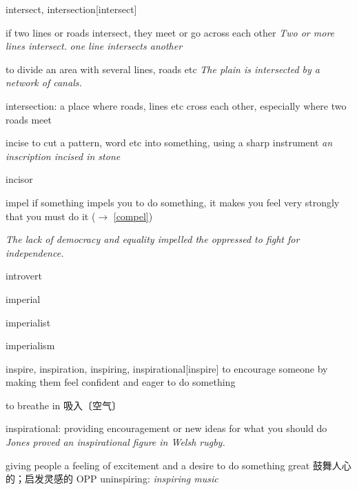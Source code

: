 \begin{DefWord}{intersect, intersection}[intersect]
    
    if two lines or roads intersect, they meet or go across each other
    \textit{Two or more lines intersect.}
    \textit{one line intersects another}

    to divide an area with several lines, roads etc
    \textit{The plain is intersected by a network of canals.}

    intersection: a place where roads, lines etc cross each other, especially where two roads meet
\end{DefWord}


\begin{DefWord}{incise}
    to cut a pattern, word etc into something, using a sharp instrument
    \textit{an inscription incised in stone}
\end{DefWord}

\begin{DefWord}{incisor}
\end{DefWord}

\begin{DefWord}{impel}
    if something impels you to do something, it makes you feel very strongly that you must do it ($\rightarrow$ \ref{compel})

    \textit{The lack of democracy and equality impelled the oppressed to fight for independence.}
\end{DefWord}



\begin{DefWord}{introvert}
\end{DefWord}

\begin{DefWord}{imperial}
\end{DefWord}

\begin{DefWord}{imperialist}
\end{DefWord}

\begin{DefWord}{imperialism}
\end{DefWord}

\begin{DefWord}{inspire, inspiration, inspiring, inspirational}[inspire]
    to encourage someone by making them feel confident and eager to do something

    to breathe in 吸入〔空气〕

    inspirational: providing encouragement or new ideas for what you should do
    \textit{Jones proved an inspirational figure in Welsh rugby.}


    giving people a feeling of excitement and a desire to do something great 鼓舞人心的；启发灵感的 OPP  uninspiring:
    \textit{inspiring music}
\end{DefWord}

